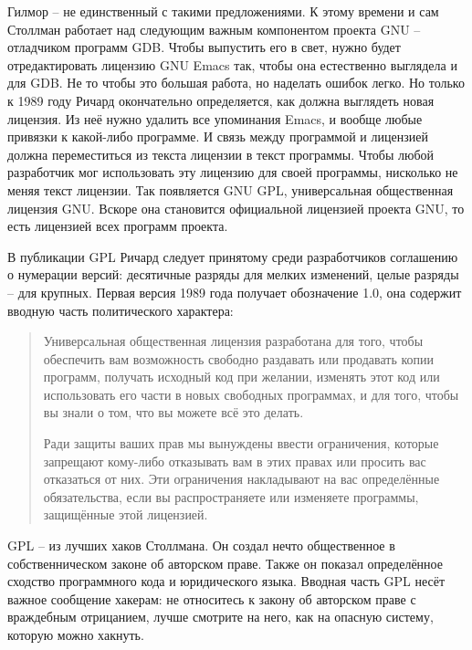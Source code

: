 Гилмор -- не единственный с такими предложениями. К этому времени и сам Столлман работает над следующим важным компонентом проекта GNU -- отладчиком программ GDB. Чтобы выпустить его в свет, нужно будет отредактировать лицензию GNU Emacs так, чтобы она естественно выглядела и для GDB. Не то чтобы это большая работа, но наделать ошибок легко. Но только к 1989 году Ричард окончательно определяется, как должна выглядеть новая лицензия. Из неё нужно удалить все упоминания Emacs, и вообще любые привязки к какой-либо программе. И связь между программой и лицензией должна переместиться из текста лицензии в текст программы. Чтобы любой разработчик мог использовать эту лицензию для своей программы, нисколько не меняя текст лицензии. Так появляется GNU GPL, универсальная общественная лицензия GNU. Вскоре она становится официальной лицензией проекта GNU, то есть лицензией всех программ проекта.

В публикации GPL Ричард следует принятому среди разработчиков соглашению о нумерации версий: десятичные разряды для мелких изменений, целые разряды -- для крупных. Первая версия 1989 года получает обозначение 1.0, она содержит вводную часть политического характера:

\begin{quote}
Универсальная общественная лицензия разработана для того, чтобы обеспечить вам возможность свободно раздавать или продавать копии программ, получать исходный код при желании, изменять этот код или использовать его части в новых свободных программах, и для того, чтобы вы знали о том, что вы можете всё это делать.

Ради защиты ваших прав мы вынуждены ввести ограничения, которые запрещают кому-либо отказывать вам в этих правах или просить вас отказаться от них. Эти ограничения накладывают на вас определённые обязательства, если вы распространяете или изменяете программы, защищённые этой лицензией.
\end{quote}

GPL -- из лучших хаков Столлмана. Он создал нечто общественное в собственническом законе об авторском праве. Также он показал определённое сходство программного кода и юридического языка. Вводная часть GPL несёт важное сообщение хакерам: не относитесь к закону об авторском праве с враждебным отрицанием, лучше смотрите на него, как на опасную систему, которую можно хакнуть.

